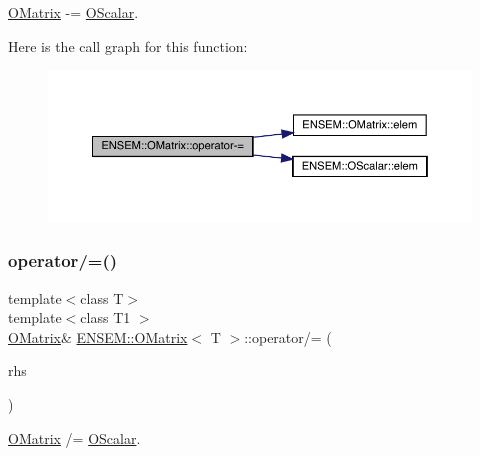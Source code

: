 \mbox{\hyperlink{classENSEM_1_1OMatrix}{O\+Matrix}} -\/= \mbox{\hyperlink{classENSEM_1_1OScalar}{O\+Scalar}}. 

Here is the call graph for this function\+:
\nopagebreak
\begin{figure}[H]
\begin{center}
\leavevmode
\includegraphics[width=350pt]{dd/d80/classENSEM_1_1OMatrix_a53a1a690a2f39f0c64c6d261efc00e4c_cgraph}
\end{center}
\end{figure}
\mbox{\label{classENSEM_1_1OMatrix_a46dc90e0e33442dcdcb9e98f9cf0025e}} 
\subsubsection{\texorpdfstring{operator/=()}{operator/=()}\hspace{0.1cm}{\footnotesize\ttfamily [1/2]}}
{\footnotesize\ttfamily template$<$class T$>$ \\
template$<$class T1 $>$ \\
\mbox{\hyperlink{classENSEM_1_1OMatrix}{O\+Matrix}}\& \mbox{\hyperlink{classENSEM_1_1OMatrix}{E\+N\+S\+E\+M\+::\+O\+Matrix}}$<$ T $>$\+::operator/= (\begin{DoxyParamCaption}\item[{const \mbox{\hyperlink{classENSEM_1_1OScalar}{O\+Scalar}}$<$ T1 $>$ \&}]{rhs }\end{DoxyParamCaption})\hspace{0.3cm}{\ttfamily [inline]}}



\mbox{\hyperlink{classENSEM_1_1OMatrix}{O\+Matrix}} /= \mbox{\hyperlink{classENSEM_1_1OScalar}{O\+Scalar}}. 

